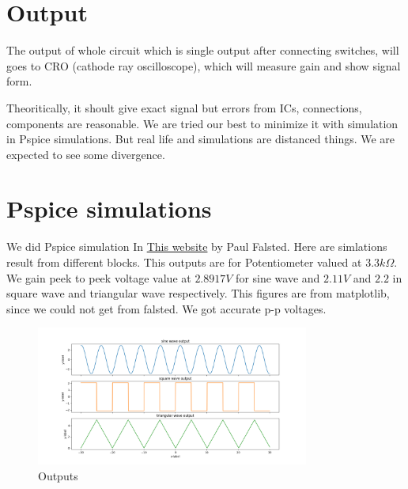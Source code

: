 \documentclass[12pt]{article}
\begin{document}
\section{Output}
\label{sec:org9d7574e}

The output of whole circuit which is single output after connecting switches, will goes to CRO (cathode ray oscilloscope), which will measure gain and show signal form.

Theoritically, it shoult give exact signal but errors from ICs, connections, components are reasonable. We are tried our best to minimize it with simulation in Pspice simulations. But real life and simulations are distanced things. We are expected to see some divergence.

\section{Pspice simulations}
\label{sec:orgc53d626}

We did Pspice simulation In \href{https://www.falstad.com/circuit/}{This website} by Paul Falsted. Here are simlations result from different blocks. This outputs are for Potentiometer valued at \(3.3k\Omega\). We gain peek to peek voltage value at \(2.8917V\) for sine wave and \(2.11V\) and \(2.2\) in square wave and triangular wave respectively. This figures are from matplotlib, since we could not get from falsted. We got accurate p-p voltages.

\begin{figure}[H]
    \centering
    \label{outputs}
    \includegraphics[width=0.8\textwidth]{imgs/outputs.png}
    \caption{Outputs}
\end{figure}



\end{document}
